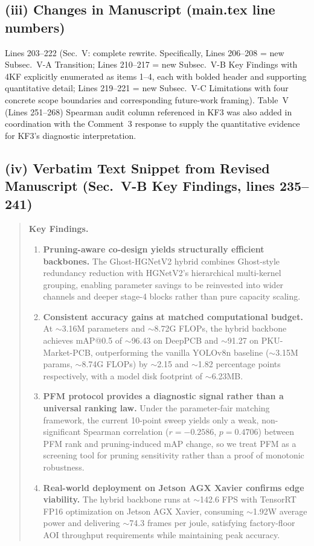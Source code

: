\documentclass[conference]{IEEEtran}
\begin{document}
\subsection*{(iii) Changes in Manuscript (main.tex line numbers)}
Lines 203--222 (Sec.~V: complete rewrite. Specifically, Lines 206--208 = new Subsec.~V-A Transition; Lines 210--217 = new Subsec.~V-B Key Findings with 4KF explicitly enumerated as items 1--4, each with bolded header and supporting quantitative detail; Lines 219--221 = new Subsec.~V-C Limitations with four concrete scope boundaries and corresponding future-work framing). Table~V (Lines 251--268) Spearman audit column referenced in KF3 was also added in coordination with the Comment~3 response to supply the quantitative evidence for KF3's diagnostic interpretation.

\subsection*{(iv) Verbatim Text Snippet from Revised Manuscript (Sec.~V-B Key Findings, lines 235--241)}
\begin{quote}
\textbf{Key Findings.}
\begin{enumerate}
    \item \textbf{Pruning-aware co-design yields structurally efficient backbones.} The Ghost-HGNetV2 hybrid combines Ghost-style redundancy reduction with HGNetV2's hierarchical multi-kernel grouping, enabling parameter savings to be reinvested into wider channels and deeper stage-4 blocks rather than pure capacity scaling.
    \item \textbf{Consistent accuracy gains at matched computational budget.} At $\sim$3.16M parameters and $\sim$8.72G FLOPs, the hybrid backbone achieves mAP@0.5 of $\sim$96.43 on DeepPCB and $\sim$91.27 on PKU-Market-PCB, outperforming the vanilla YOLOv8n baseline ($\sim$3.15M params, $\sim$8.74G FLOPs) by $\sim$2.15 and $\sim$1.82 percentage points respectively, with a model disk footprint of $\sim$6.23MB.
    \item \textbf{PFM protocol provides a diagnostic signal rather than a universal ranking law.} Under the parameter-fair matching framework, the current 10-point sweep yields only a weak, non-significant Spearman correlation ($r=-0.2586$, $p=0.4706$) between PFM rank and pruning-induced mAP change, so we treat PFM as a screening tool for pruning sensitivity rather than a proof of monotonic robustness.
    \item \textbf{Real-world deployment on Jetson AGX Xavier confirms edge viability.} The hybrid backbone runs at $\sim$142.6 FPS with TensorRT FP16 optimization on Jetson AGX Xavier, consuming $\sim$1.92W average power and delivering $\sim$74.3 frames per joule, satisfying factory-floor AOI throughput requirements while maintaining peak accuracy.
\end{enumerate}
\end{quote}
\end{document}
